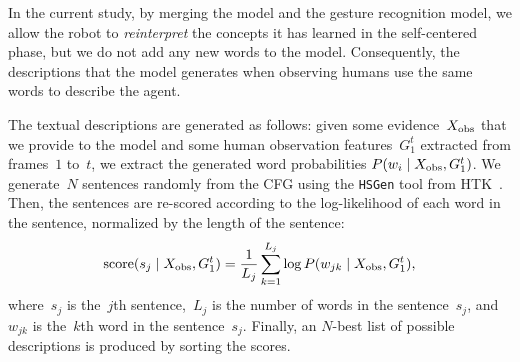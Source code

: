 In the current study, by merging the \AffWords{} model and the gesture recognition model, we allow the robot to \emph{reinterpret} the concepts it has learned in the self-centered phase, but we do not add any new words to the model.
Consequently, the descriptions that the model generates when observing humans use the same words to describe the agent.

The textual descriptions are generated as follows: given some evidence~$X_\text{obs}$ that we provide to the model and some human observation features~$G_1^t$ extracted from frames~$1$ to~$t$, we extract the generated word probabilities
$P(w_i \mid X_\text{obs}, G_1^t)$.
We generate~$N$ sentences randomly from the \ac{CFG} using the \texttt{HSGen} tool from HTK~\cite{young:htkbook}.
Then, the sentences are re-scored according to the log-likelihood of each word in the sentence, normalized by the length of the sentence:
\begin{equation} \label{eq:sentence_score}
  \text{score}(s_j \given \xobs, G_1^t) = \frac{1}{L_j} \sum_{k=1}^{L_j} \log P(w_{jk} \given \xobs, G_1^t),
\end{equation}
where~$s_j$ is the~$j$th sentence,~$L_j$ is the number of words in the sentence~$s_j$, and~$w_{jk}$ is the~$k$th word in the sentence~$s_j$.
Finally, an $N$-best list of possible descriptions is produced by sorting the scores.
